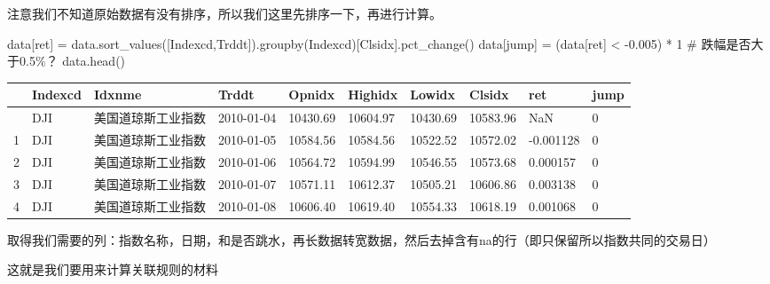 \documentclass[
  letterpaper,
  DIV=11,
  numbers=noendperiod]{scrreprt}
\newenvironment{Shaded}{\begin{snugshade}}{\end{snugshade}}
\newcommand{\CommentTok}[1]{\textcolor[rgb]{0.37,0.37,0.37}{#1}}
\newcommand{\DecValTok}[1]{\textcolor[rgb]{0.68,0.00,0.00}{#1}}
\newcommand{\FloatTok}[1]{\textcolor[rgb]{0.68,0.00,0.00}{#1}}
\newcommand{\NormalTok}[1]{\textcolor[rgb]{0.00,0.23,0.31}{#1}}
\newcommand{\OperatorTok}[1]{\textcolor[rgb]{0.37,0.37,0.37}{#1}}
\newcommand{\StringTok}[1]{\textcolor[rgb]{0.13,0.47,0.30}{#1}}
\begin{document}
注意我们不知道原始数据有没有排序，所以我们这里先排序一下，再进行计算。

\begin{Shaded}
\begin{Highlighting}[]
\NormalTok{data[}\StringTok{\textquotesingle{}ret\textquotesingle{}}\NormalTok{] }\OperatorTok{=}\NormalTok{ data.sort\_values([}\StringTok{\textquotesingle{}Indexcd\textquotesingle{}}\NormalTok{,}\StringTok{\textquotesingle{}Trddt\textquotesingle{}}\NormalTok{]).groupby(}\StringTok{\textquotesingle{}Indexcd\textquotesingle{}}\NormalTok{)[}\StringTok{\textquotesingle{}Clsidx\textquotesingle{}}\NormalTok{].pct\_change()}
\NormalTok{data[}\StringTok{\textquotesingle{}jump\textquotesingle{}}\NormalTok{] }\OperatorTok{=}\NormalTok{ (data[}\StringTok{\textquotesingle{}ret\textquotesingle{}}\NormalTok{] }\OperatorTok{\textless{}} \OperatorTok{{-}}\FloatTok{0.005}\NormalTok{) }\OperatorTok{*} \DecValTok{1} \CommentTok{\# 跌幅是否大于0.5\%？}
\NormalTok{data.head()}
\end{Highlighting}
\end{Shaded}

\begin{longtable}[]{@{}llllllllll@{}}
\toprule\noalign{}
& Indexcd & Idxnme & Trddt & Opnidx & Highidx & Lowidx & Clsidx & ret &
jump \\
\midrule\noalign{}
\endhead
\bottomrule\noalign{}
\endlastfoot
0 & DJI & 美国道琼斯工业指数 & 2010-01-04 & 10430.69 & 10604.97 &
10430.69 & 10583.96 & NaN & 0 \\
1 & DJI & 美国道琼斯工业指数 & 2010-01-05 & 10584.56 & 10584.56 &
10522.52 & 10572.02 & -0.001128 & 0 \\
2 & DJI & 美国道琼斯工业指数 & 2010-01-06 & 10564.72 & 10594.99 &
10546.55 & 10573.68 & 0.000157 & 0 \\
3 & DJI & 美国道琼斯工业指数 & 2010-01-07 & 10571.11 & 10612.37 &
10505.21 & 10606.86 & 0.003138 & 0 \\
4 & DJI & 美国道琼斯工业指数 & 2010-01-08 & 10606.40 & 10619.40 &
10554.33 & 10618.19 & 0.001068 & 0 \\
\end{longtable}

取得我们需要的列：指数名称，日期，和是否跳水，再长数据转宽数据，然后去掉含有na的行（即只保留所以指数共同的交易日）

这就是我们要用来计算关联规则的材料
\end{document}
